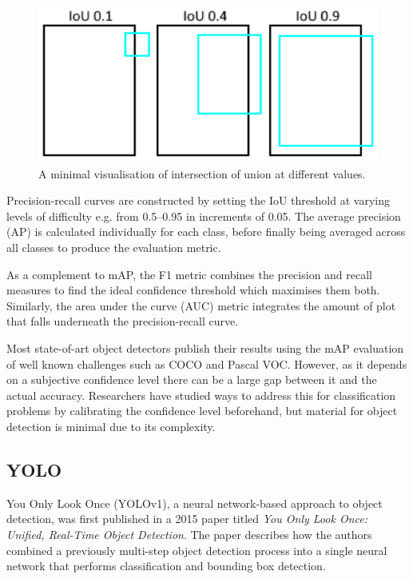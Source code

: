 \documentclass{thesis}
\begin{document}
\begin{figure}[h]
    \centering
    \includegraphics[scale=0.5]{images/iou.png}
    \caption{A minimal visualisation of intersection of union at different values.}
    \label{fig:cnn-diagram}
\end{figure}

Precision-recall curves are constructed by setting the IoU threshold at varying levels of difficulty e.g. from 0.5--0.95 in increments of 0.05. The average precision (AP) is calculated individually for each class, before finally being averaged across all classes to produce the evaluation metric.

As a complement to mAP, the F1 metric combines the precision and recall measures to find the ideal confidence threshold which maximises them both. Similarly,
the area under the curve (AUC) metric integrates the amount of plot that falls underneath the precision-recall curve.

Most state-of-art object detectors publish their results using the mAP evaluation of well known challenges such as COCO\cite{lin2015microsoft} and Pascal VOC\cite{Everingham15}. However, as it depends on a subjective confidence level there can be a large gap between it and the actual accuracy\cite{Peng2021}. Researchers have studied ways to address this for classification problems by calibrating the confidence level beforehand\cite{guo2017calibration}, but material for object detection is minimal due to its complexity.


\subsection{YOLO}

You Only Look Once (YOLOv1), a neural network-based approach to object detection, was first published in a 2015 paper titled \textit{You Only Look Once: Unified, Real-Time Object Detection}. The paper describes how the authors combined a previously multi-step object detection process into a single neural network that performs classification and bounding box detection.
\end{document}
